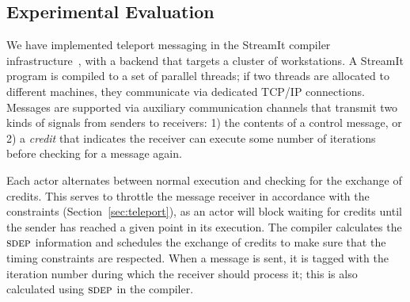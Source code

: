 \subsection{Experimental Evaluation}
\label{sec:evaluation}

We have implemented teleport messaging in the StreamIt compiler
infrastructure~\cite{streamit-asplos}, with a backend that targets a
cluster of workstations.  A StreamIt program is compiled to a set of
parallel threads; if two threads are allocated to different machines,
they communicate via dedicated TCP/IP connections.  Messages are
supported via auxiliary communication channels that transmit two kinds
of signals from senders to receivers: 1) the contents of a control
message, or 2) a {\it credit} that indicates the receiver can execute
some number of iterations before checking for a message again.

Each actor alternates between normal execution and checking for the
exchange of credits.  This serves to throttle the message receiver in
accordance with the constraints (Section~\ref{sec:teleport}), as an
actor will block waiting for credits until the sender has reached a
given point in its execution.  The compiler calculates the $\textsc{sdep}$
information and schedules the exchange of credits to make sure that
the timing constraints are respected.  When a message is sent, it is
tagged with the iteration number during which the receiver should
process it; this is also calculated using $\textsc{sdep}$ in the compiler.




